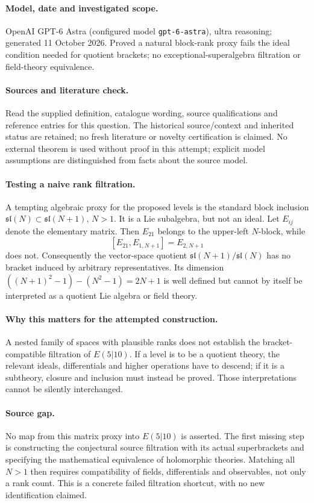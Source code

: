 \documentclass[11pt]{article}
\begin{document}
\paragraph{Model, date and investigated scope.}
OpenAI GPT-6 Astra (configured model \texttt{gpt-6-astra}), ultra reasoning; generated 11 October 2026. Proved a natural block-rank proxy fails the ideal condition needed for quotient brackets; no exceptional-superalgebra filtration or field-theory equivalence.

\paragraph{Sources and literature check.}
Read the supplied definition, catalogue wording, source qualifications and reference entries for this question. The historical source/context and inherited status are retained; no fresh literature or novelty certification is claimed. No external theorem is used without proof in this attempt; explicit model assumptions are distinguished from facts about the source model.

\paragraph{Testing a naive rank filtration.} A tempting algebraic proxy for the proposed levels is the standard block inclusion \(\mathfrak{sl}(N)\subset\mathfrak{sl}(N+1)\), \(N>1\). It is a Lie subalgebra, but not an ideal. Let \(E_{ij}\) denote the elementary matrix. Then \(E_{21}\) belongs to the upper-left \(N\)-block, while
\[
 [E_{21},E_{1,N+1}]=E_{2,N+1}
\]
does not. Consequently the vector-space quotient \(\mathfrak{sl}(N+1)/\mathfrak{sl}(N)\) has no bracket induced by arbitrary representatives. Its dimension \(((N+1)^2-1)-(N^2-1)=2N+1\) is well defined but cannot by itself be interpreted as a quotient Lie algebra or field theory.
\paragraph{Why this matters for the attempted construction.} A nested family of spaces with plausible ranks does not establish the bracket-compatible filtration of \(E(5|10)\). If a level is to be a quotient theory, the relevant ideals, differentials and higher operations have to descend; if it is a subtheory, closure and inclusion must instead be proved. Those interpretations cannot be silently interchanged.
\paragraph{Source gap.} No map from this matrix proxy into \(E(5|10)\) is asserted. The first missing step is constructing the conjectural source filtration with its actual superbrackets and specifying the mathematical equivalence of holomorphic theories. Matching all \(N>1\) then requires compatibility of fields, differentials and observables, not only a rank count. This is a concrete failed filtration shortcut, with no new identification claimed.
\end{document}
